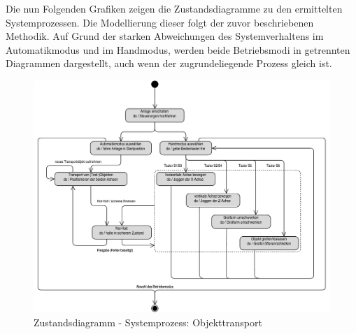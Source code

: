 \documentclass[../Bachelorarbeit.tex]{subfiles}
\begin{document}
Die nun Folgenden Grafiken zeigen die Zustandsdiagramme zu den ermittelten Systemprozessen. Die Modellierung dieser folgt der zuvor beschriebenen Methodik. Auf Grund der starken Abweichungen des Systemverhaltens im Automatikmodus und im Handmodus, werden beide Betriebsmodi in getrennten Diagrammen dargestellt, auch wenn der zugrundeliegende Prozess gleich ist. 

\begin{figure}[h]
    \centering
    \includegraphics[width=\textwidth]{Images/zustandsdiagramm.pdf}
    \caption[Zustandsdiagramm]{Zustandsdiagramm - Systemprozess: Objekttransport}
    \label{fig:my-img4}
\end{figure}
\end{document}
